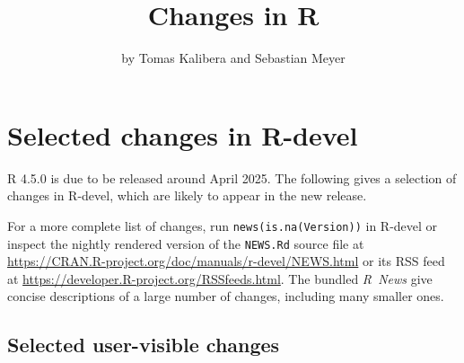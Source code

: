 \title{Changes in R}


\author{by Tomas Kalibera and Sebastian Meyer}

\maketitle


\section{Selected changes in R-devel}\label{selected-changes-in-r-devel}

R 4.5.0 is due to be released around April 2025. The following gives a
selection of changes in R-devel, which are likely to appear in the new
release.

For a more complete list of changes, run \texttt{news(is.na(Version))} in R-devel or
inspect the nightly rendered version of the \texttt{NEWS.Rd} source file at
\url{https://CRAN.R-project.org/doc/manuals/r-devel/NEWS.html} or its RSS feed at
\url{https://developer.R-project.org/RSSfeeds.html}. The bundled \emph{R~News}
give concise descriptions of a large number of changes, including many
smaller ones.

\subsection{Selected user-visible changes}\label{selected-user-visible-changes}

